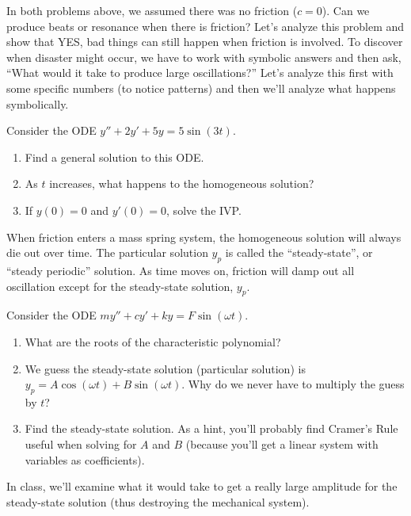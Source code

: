 In both problems above, we assumed there was no friction ($c=0$).  Can we produce beats or resonance when there is friction? Let's analyze this problem and show that YES, bad things can still happen when friction is involved. To discover when disaster might occur, we have to work with symbolic answers and then ask, ``What would it take to produce large oscillations?''  Let's analyze this first with some specific numbers (to notice patterns) and then we'll analyze what happens symbolically.
\begin{problem}
Consider the ODE $y''+2y'+5y=5\sin(3 t)$.
\begin{enumerate}
 \item Find a general solution to this ODE.  
 \item As $t$ increases, what happens to the homogeneous solution?
 \item If $y(0)=0$ and $y'(0)=0$, solve the IVP.
\end{enumerate}
\end{problem}

When friction enters a mass spring system, the homogeneous solution will always die out over time. The particular solution $y_p$ is called the ``steady-state'', or ``steady periodic'' solution. As time moves on, friction will damp out all oscillation except for the steady-state solution, $y_p$.  

\begin{problem}
Consider the ODE $my''+cy'+ky=F\sin(\omega t)$.
\begin{enumerate}
 \item What are the roots of the characteristic polynomial?
 \item We guess the steady-state solution (particular solution) is $y_p=A\cos(\omega t)+B\sin(\omega t)$.  Why do we never have to multiply the guess by $t$?
 \item Find the steady-state solution. As a hint, you'll probably find Cramer's Rule useful when solving for $A$ and $B$ (because you'll get a linear system with variables as coefficients). 
\end{enumerate}
 In class, we'll examine what it would take to get a really large amplitude for the steady-state solution (thus destroying the mechanical system).
\end{problem}
  

